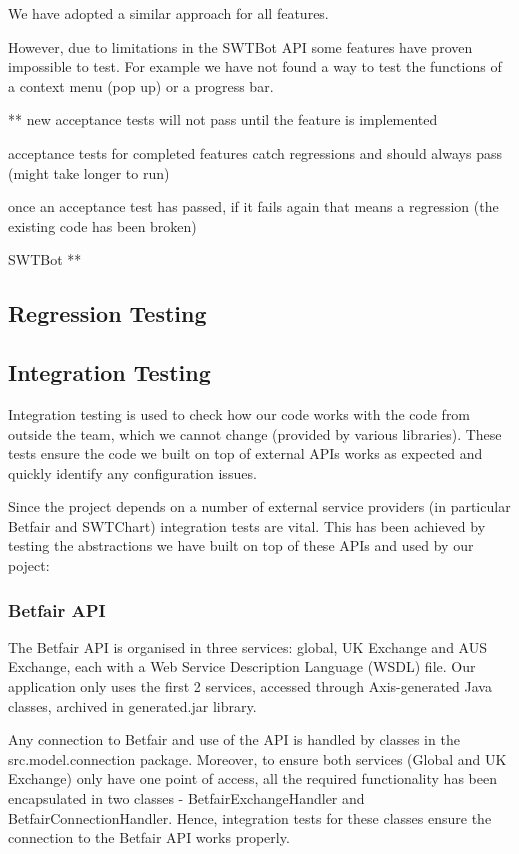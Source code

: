 \documentclass[10pt]{article}
\begin{document}
We have adopted a similar approach for all features.

However, due to limitations in the SWTBot API some features have proven impossible to test. For example we have not found a way to test the functions of a context menu (pop up) or a progress bar.

** new acceptance tests will not pass until the feature is implemented

acceptance tests for completed features catch regressions and should always pass (might take
longer to run)

once an acceptance test has passed, if it fails again that means a regression (the existing code has been broken)

SWTBot **

\subsection{Regression Testing}


\subsection{Integration Testing}

Integration testing is used to check how our code works with the code from outside the team, which we cannot change (provided by various libraries). These tests ensure the code we built on top of external APIs works as expected and quickly identify any configuration issues.

Since the project depends on a number of external service providers (in particular Betfair and SWTChart) integration tests are vital. This has been achieved by testing the abstractions we have built on top of these APIs and used by our poject:

\subsubsection{Betfair API}

The Betfair API is organised in three services: global, UK Exchange and AUS Exchange, each with a Web Service Description Language (WSDL) file. Our application only uses the first 2 services, accessed through Axis-generated Java classes, archived in generated.jar library.

Any connection to Betfair and use of the API is handled by classes in the src.model.connection package. Moreover, to ensure both services (Global and UK Exchange) only have one point of access, all the required functionality has been encapsulated in two classes - BetfairExchangeHandler and BetfairConnectionHandler. Hence, integration tests for these classes ensure the connection to the Betfair API works properly.
\end{document}
